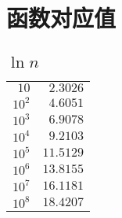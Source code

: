 \section{函数对应值}
\subsection{$\ln n$} \label{subsec:lnn}
\begin{center}
\begin{tabular}{rr}
    \toprule
    $10$ & $2.3026$ \\
    $10^2$ & $4.6051$ \\
    $10^3$ & $6.9078$ \\
    $10^4$ & $9.2103$ \\
    $10^5$ & $11.5129$ \\
    $10^6$ & $13.8155$ \\
    $10^7$ & $16.1181$ \\
    $10^8$ & $18.4207$ \\
    \bottomrule
\end{tabular}
\end{center}



